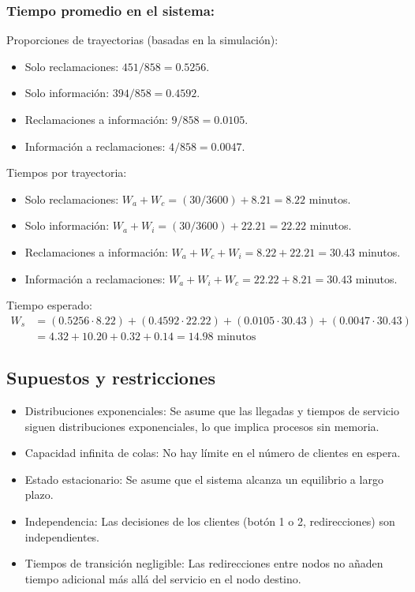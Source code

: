 \documentclass[12pt]{article}
\begin{document}
\subsubsection{Tiempo promedio en el sistema:}
Proporciones de trayectorias (basadas en la simulación):
\begin{itemize}
    \item Solo reclamaciones: $451/858 = 0.5256$.
    \item Solo información: $394/858 = 0.4592$.
    \item Reclamaciones a información: $9/858 = 0.0105$.
    \item Información a reclamaciones: $4/858 = 0.0047$.
\end{itemize}
Tiempos por trayectoria:
\begin{itemize}
    \item Solo reclamaciones: $W_a + W_c = (30/3600) + 8.21 = 8.22$ minutos.
    \item Solo información: $W_a + W_i = (30/3600) + 22.21 = 22.22$ minutos.
    \item Reclamaciones a información: $W_a + W_c + W_i = 8.22 + 22.21 = 30.43$ minutos.
    \item Información a reclamaciones: $W_a + W_i + W_c = 22.22 + 8.21 = 30.43$ minutos.
\end{itemize}
Tiempo esperado:
\begin{align*}
    W_s &= (0.5256 \cdot 8.22) + (0.4592 \cdot 22.22) + (0.0105 \cdot 30.43) + (0.0047 \cdot 30.43) \\
    &= 4.32 + 10.20 + 0.32 + 0.14 = 14.98 \text{ minutos}
\end{align*}

\subsection{Supuestos y restricciones}
\begin{itemize}
    \item Distribuciones exponenciales: Se asume que las llegadas y tiempos de servicio siguen distribuciones exponenciales, lo que implica procesos sin memoria.
    \item Capacidad infinita de colas: No hay límite en el número de clientes en espera.
    \item Estado estacionario: Se asume que el sistema alcanza un equilibrio a largo plazo.
    \item Independencia: Las decisiones de los clientes (botón 1 o 2, redirecciones) son independientes.
    \item Tiempos de transición negligible: Las redirecciones entre nodos no añaden tiempo adicional más allá del servicio en el nodo destino.
\end{itemize}
\end{document}
